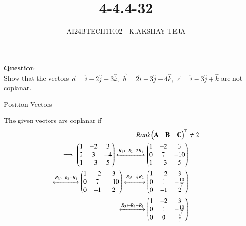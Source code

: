 \documentclass[journal]{IEEEtran}
\begin{document}

\vspace{3cm}

\title{4-4.4-32}
\author{AI24BTECH11002 - K.AKSHAY TEJA}
{\let\newpage\relax\maketitle}

\renewcommand{\thefigure}{\theenumi}
\renewcommand{\thetable}{\theenumi}
\setlength{\intextsep}{10pt} %


\renewcommand{\thetable}{\theenumi}


\textbf{Question}:\\
Show that the vectors \(\vec{a} = \hat{i} - 2 \hat{j} + 3 \hat{k}, \; 
\vec{b} = 2 \hat{i} + 3 \hat{j} - 4 \hat{k}, \;\vec{c} = \hat{i} - 3 \hat{j} + \hat{k}\) are not coplanar.\\

\solution
\begin{table}[h!]
	\centering
	
	\caption{Position Vectors}
	\label{tab:4-4.4-32}
\end{table}
The given vectors are coplanar if 
\begin{align}
	Rank\begin{pmatrix}\mathbf{A} & \mathbf{B} & \mathbf{C}\end{pmatrix}^\top &\neq 2\\
	\implies \begin{pmatrix}1 &-2 & 3\\ 2 &3 &-4\\1 &-3 &5\end{pmatrix} \xleftrightarrow[]{R_2 \leftarrow R_2 - 2R_1} \begin{pmatrix}1 &-2& 3\\0& 7& -10\\1 &-3 &5\end{pmatrix}\\
 \xleftrightarrow[]{R_3 \leftarrow R_3 - R_1 } \begin{pmatrix}1 &-2& 3\\0& 7 &-10\\0& -1 &2\end{pmatrix}
	\xleftrightarrow[]{R_2 \leftarrow \frac{1}{7}R_2} \begin{pmatrix}1 &-2& 3\\0& 1& -\frac{10}{7}\\0 &-1& 2\end{pmatrix}\\\xleftrightarrow[]{R_3 \leftarrow R_3-R_1}\begin{pmatrix}1&-2& 3 \\0& 1 &-\frac{10}{7}\\0& 0& \frac{4}{7} \end{pmatrix}
\end{align}
\end{document}
